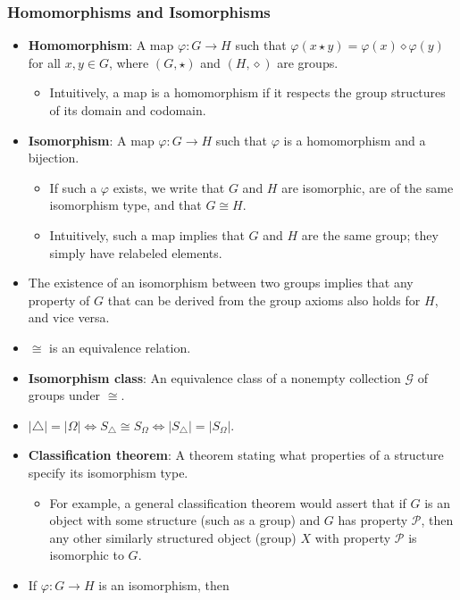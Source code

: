 \documentclass[../main.tex]{subfiles}
\begin{document}
\subsubsection{Homomorphisms and Isomorphisms}
\begin{itemize}
    \item \textbf{Homomorphism}: A map $\varphi:G\to H$ such that $\varphi(x\star y)=\varphi(x)\diamond\varphi(y)$ for all $x,y\in G$, where $(G,\star)$ and $(H,\diamond)$ are groups.
    \begin{itemize}
        \item Intuitively, a map is a homomorphism if it respects the group structures of its domain and codomain.
    \end{itemize}
    \item \textbf{Isomorphism}: A map $\varphi:G\to H$ such that $\varphi$ is a homomorphism and a bijection.
    \begin{itemize}
        \item If such a $\varphi$ exists, we write that $G$ and $H$ are isomorphic, are of the same isomorphism type, and that $G\cong H$.
        \item Intuitively, such a map implies that $G$ and $H$ are the same group; they simply have relabeled elements.
    \end{itemize}
    \item The existence of an isomorphism between two groups implies that any property of $G$ that can be derived from the group axioms also holds for $H$, and vice versa.
    \item $\cong$ is an equivalence relation.
    \item \textbf{Isomorphism class}: An equivalence class of a nonempty collection $\mathcal{G}$ of groups under $\cong$.
    \item $|\triangle|=|\Omega|\Longleftrightarrow S_\triangle\cong S_\Omega\Longleftrightarrow|S_\triangle|=|S_\Omega|$.
    \item \textbf{Classification theorem}: A theorem stating what properties of a structure specify its isomorphism type.
    \begin{itemize}
        \item For example, a general classification theorem would assert that if $G$ is an object with some structure (such as a group) and $G$ has property $\mathcal{P}$, then any other similarly structured object (group) $X$ with property $\mathcal{P}$ is isomorphic to $G$.
    \end{itemize}
    \item If $\varphi:G\to H$ is an isomorphism, then

\end{itemize}
\end{document}
